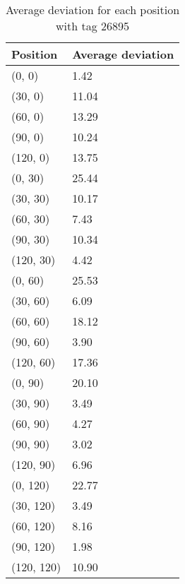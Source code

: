 \begin{table}[]
    \centering
    \begin{tabular}{|l|l|}
    \hline
    Position   & Average deviation \\ \hline
    (0, 0)     & 1.42              \\ \hline
    (30, 0)    & 11.04             \\ \hline
    (60, 0)    & 13.29             \\ \hline
    (90, 0)    & 10.24             \\ \hline
    (120, 0)   & 13.75             \\ \hline
    (0, 30)    & 25.44             \\ \hline
    (30, 30)   & 10.17             \\ \hline
    (60, 30)   & 7.43              \\ \hline
    (90, 30)   & 10.34             \\ \hline
    (120, 30)  & 4.42              \\ \hline
    (0, 60)    & 25.53             \\ \hline
    (30, 60)   & 6.09              \\ \hline
    (60, 60)   & 18.12             \\ \hline
    (90, 60)   & 3.90              \\ \hline
    (120, 60)  & 17.36             \\ \hline
    (0, 90)    & 20.10             \\ \hline
    (30, 90)   & 3.49              \\ \hline
    (60, 90)   & 4.27              \\ \hline
    (90, 90)   & 3.02              \\ \hline
    (120, 90)  & 6.96              \\ \hline
    (0, 120)   & 22.77             \\ \hline
    (30, 120)  & 3.49              \\ \hline
    (60, 120)  & 8.16              \\ \hline
    (90, 120)  & 1.98              \\ \hline
    (120, 120) & 10.90             \\ \hline
    \end{tabular}
    \label{average-deviation-1-tag}
    \caption{Average deviation for each position with tag 26895}
\end{table}

